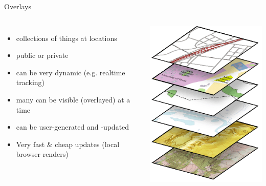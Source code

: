 \documentclass{beamer}
\begin{document}
\begin{frame}{Overlays}
 \begin{columns}
   \begin{itemize}
    \item collections of things at locations
    \item public or private
    \item can be very dynamic (e.g. realtime tracking)
    \item many can be visible (overlayed) at a time
    \item can be user-generated and -updated
    \item Very fast \& cheap updates (local browser renders)
   \end{itemize}
   \includegraphics[scale=0.5]{images/basemap_layers}
 \end{columns}
\end{frame}
\end{document}
